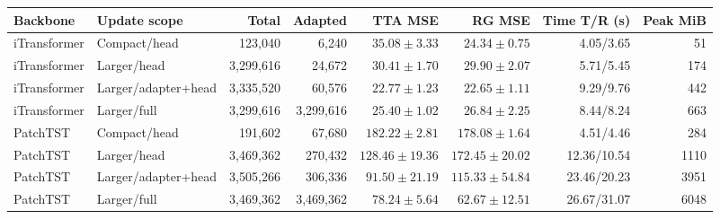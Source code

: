 \begin{tabular}{llrrrrrr}
\toprule
Backbone & Update scope & Total & Adapted & TTA MSE & RG MSE & Time T/R (s) & Peak MiB \\
\midrule
iTransformer & Compact/head & 123,040 & 6,240 & $35.08\pm3.33$ & $24.34\pm0.75$ & 4.05/3.65 & 51 \\
iTransformer & Larger/head & 3,299,616 & 24,672 & $30.41\pm1.70$ & $29.90\pm2.07$ & 5.71/5.45 & 174 \\
iTransformer & Larger/adapter+head & 3,335,520 & 60,576 & $22.77\pm1.23$ & $22.65\pm1.11$ & 9.29/9.76 & 442 \\
iTransformer & Larger/full & 3,299,616 & 3,299,616 & $25.40\pm1.02$ & $26.84\pm2.25$ & 8.44/8.24 & 663 \\
PatchTST & Compact/head & 191,602 & 67,680 & $182.22\pm2.81$ & $178.08\pm1.64$ & 4.51/4.46 & 284 \\
PatchTST & Larger/head & 3,469,362 & 270,432 & $128.46\pm19.36$ & $172.45\pm20.02$ & 12.36/10.54 & 1110 \\
PatchTST & Larger/adapter+head & 3,505,266 & 306,336 & $91.50\pm21.19$ & $115.33\pm54.84$ & 23.46/20.23 & 3951 \\
PatchTST & Larger/full & 3,469,362 & 3,469,362 & $78.24\pm5.64$ & $62.67\pm12.51$ & 26.67/31.07 & 6048 \\
\bottomrule
\end{tabular}
